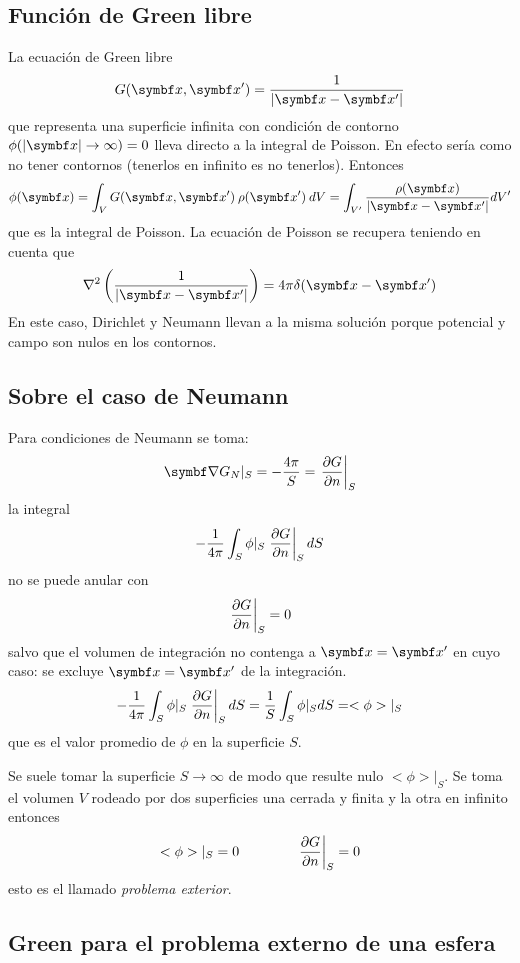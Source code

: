 \documentclass[10pt,oneside]{CBFT_book}
\begin{document}
\subsection{Función de Green libre}

La ecuación de Green libre
\[
	G(\vb{x}, \vb{x}') = \frac{1}{|\vb{x} - \vb{x}'|}
\]
que representa una superficie infinita con condición de contorno $\phi(|\vbx| \to \infty) = 0 $
lleva directo a la integral de Poisson. En efecto sería como no tener contornos (tenerlos en
infinito es no tenerlos).
Entonces 
\[
	\phi(\vb{x}) = \int_V G(\vbx,\vbx') \: \rho(\vbx') \:dV = 
	\int_{V'} \frac{ \rho(\vb{x}) }{|\vb{x}-\vb{x}'|} dV'
\]
que es la integral de Poisson. La ecuación de Poisson se recupera teniendo en cuenta
que
\[
	\nabla^2 \left( \frac{1}{|\vb{x} - \vb{x}'|} \right) = 4\pi \delta(\vb{x}-\vb{x}')
\]
En este caso, Dirichlet y Neumann llevan a la misma solución porque potencial y campo son
nulos en los contornos.

\subsection{Sobre el caso de Neumann}

Para condiciones de Neumann se toma:
\[
	\Nabla G_N|_S = -\frac{4\pi}{S} = \left. \dpar{G}{n} \right|_S
\]
la integral 
\[
	- \frac{1}{4\pi} \int_S \phi|_S \left.\frac{\partial^{\hspace{-0.05em}} {G}}{\partial {n}^{\hspace{-0.05em}}}\right|_S  dS
\]
no se puede anular con 
\[
	\left.\frac{\partial^{\hspace{-0.05em}} {G}}{\partial {n}^{\hspace{-0.05em}}}\right|_S = 0
\]
salvo que el volumen de integración no contenga a $\vb{x}=\vb{x}'$ en cuyo caso:
se excluye $\vb{x}=\vb{x}'$ de la integración.
\[
	- \frac{1}{4\pi} \int_S \phi|_S \left.\frac{\partial^{\hspace{-0.05em}} {G}}{\partial {n}^{\hspace{-0.05em}}}\right|_S  dS =
	\frac{1}{S} \int_S \phi|_S dS = <\phi>|_S
\]
que es el valor promedio de $\phi$ en la superficie $S$.

Se suele tomar la superficie $S \to \infty$ de modo que resulte nulo $<\phi>|_S$.
Se toma el volumen $V$ rodeado por dos superficies una cerrada y finita y la otra
en infinito entonces
\[
	<\phi>|_S = 0 \qquad \qquad \left. \frac{\partial^{\hspace{-0.05em}} {G}}{\partial {n}^{\hspace{-0.05em}}}\right|_S = 0
\]
esto es el llamado {\it problema exterior}.

\subsection{Green para el problema externo de una esfera}
\end{document}
